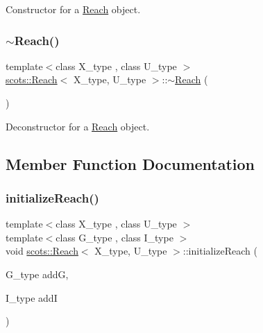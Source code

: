 Constructor for a \hyperlink{classscots_1_1Reach}{Reach} object. \mbox{\label{classscots_1_1Reach_a05425187c9015158f5495904c34342d0}} 
\subsubsection{\texorpdfstring{$\sim$\+Reach()}{~Reach()}}
{\footnotesize\ttfamily template$<$class X\+\_\+type , class U\+\_\+type $>$ \\
\hyperlink{classscots_1_1Reach}{scots\+::\+Reach}$<$ X\+\_\+type, U\+\_\+type $>$\+::$\sim$\hyperlink{classscots_1_1Reach}{Reach} (\begin{DoxyParamCaption}{ }\end{DoxyParamCaption})\hspace{0.3cm}{\ttfamily [inline]}}

Deconstructor for a \hyperlink{classscots_1_1Reach}{Reach} object. 

\subsection{Member Function Documentation}
\mbox{\label{classscots_1_1Reach_ad49c77293343ad0ce4f36c9deee45f00}} 
\subsubsection{\texorpdfstring{initialize\+Reach()}{initializeReach()}}
{\footnotesize\ttfamily template$<$class X\+\_\+type , class U\+\_\+type $>$ \\
template$<$class G\+\_\+type , class I\+\_\+type $>$ \\
void \hyperlink{classscots_1_1Reach}{scots\+::\+Reach}$<$ X\+\_\+type, U\+\_\+type $>$\+::initialize\+Reach (\begin{DoxyParamCaption}\item[{G\+\_\+type}]{addG,  }\item[{I\+\_\+type}]{addI }\end{DoxyParamCaption})\hspace{0.3cm}{\ttfamily [inline]}}

